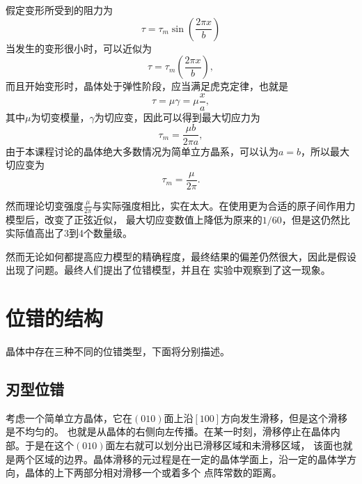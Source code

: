             假定变形所受到的阻力为
            \begin{equation}
                \tau=\tau_m\sin{\left( \frac{2\pi x}{b} \right)}
            \end{equation}
            当发生的变形很小时，可以近似为
            \begin{equation}
                \tau=\tau_m{\left( \frac{2\pi x}{b} \right)},
            \end{equation}
            而且开始变形时，晶体处于弹性阶段，应当满足虎克定律，也就是
            \begin{equation}
                \tau=\mu\gamma=\mu\frac{x}{a},
            \end{equation}
            其中$\mu$为切变模量，$\gamma$为切应变，因此可以得到最大切应力为
            \begin{equation}
                \tau_m=\frac{\mu b}{2\pi a},
            \end{equation}
            由于本课程讨论的晶体绝大多数情况为简单立方晶系，可以认为$a=b$，所以最大切应变为
            \begin{equation}
                \tau_m=\frac{\mu}{2\pi}.
            \end{equation}

            然而理论切变强度$\frac{\mu}{2\pi}$与实际强度相比，实在太大。在使用更为合适的原子间作用力模型后，改变了正弦近似，
            最大切应变数值上降低为原来的$1/60$，但是这仍然比实际值高出了3到4个数量级。

            然而无论如何都提高应力模型的精确程度，最终结果的偏差仍然很大，因此是假设出现了问题。最终人们提出了位错模型，并且在
            实验中观察到了这一现象。
        
    \section{位错的结构}
        晶体中存在三种不同的位错类型，下面将分别描述。
            \subsection{刃型位错}
                考虑一个简单立方晶体，它在$(010)$面上沿$[100]$方向发生滑移，但是这个滑移是不均匀的。
                也就是从晶体的右侧向左传播。在某一时刻，滑移停止在晶体内部。于是在这个$(010)$面左右就可以划分出已滑移区域和未滑移区域，
                该面也就是两个区域的边界。晶体滑移的元过程是在一定的晶体学面上，沿一定的晶体学方向，晶体的上下两部分相对滑移一个或着多个
                点阵常数的距离。

